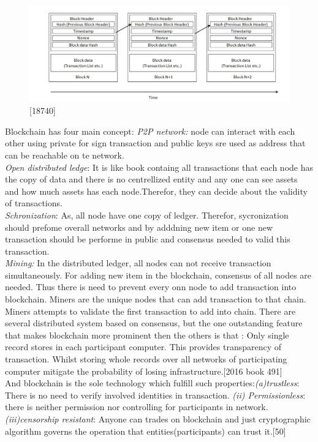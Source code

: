  \begin{center}
 	\begin{figure}[htb!]
 		
 		\begin{minipage}{0.55\linewidth}
 			\centering
 			\includegraphics[width=1.95\textwidth]{images/chap01_BlockChain.png}
 		\end{minipage}
 		\caption[Generic chain og blocks]{[18740]}
 		
 		
 	\end{figure}
 	
 \end{center}
Blockchain has four main concept: \textit{P2P network:} node can interact with each other using private for sign transaction and public keys sre used as address that can be reachable on te network. \\
   \textit{Open distributed ledge}: It is like book containg all transactions that each node has the copy of data and there is no centrellized entity and any one can see assets and how much assets has each node.Therefor, they can decide about the validity of transactions.\\
   \textit{Schronization}: As, all node have one copy of ledger. Therefor, sycronization should prefome overall networks and by adddning new item or one new transaction should be performe in public and consensus needed to valid this transaction.\\
   \textit{Mining: }In the distributed ledger, all nodes can not receive transaction simultaneously. For adding new item in the blockchain, consensus of all nodes are needed. Thus there is need to prevent every onn node to add transaction into blockchain. Miners are the unique nodes that can add transaction to that chain. Miners attempts to validate the first transaction to add into chain.  
There are several distributed system based on consensus, but the one outstanding feature that makes blockchain  more prominent then the others is that :
 Only single record stores in each participant computer. This provides transparency of transaction. Whilst storing whole 
records over all networks of participating computer mitigate the probability of losing infrastructure.[2016 book 491]\\
And blockchain is the sole technology which fulfill such properties:\textit{(a)trustless}: There is no need to verify involved identities in transaction. \textit{(ii) Permissionless}: there is neither permission nor controlling for participants in network.   \textit{(iii)censorship resistant}: Anyone can trades on blockchain and just cryptographic algorithm governs the operation that entities(participants) can trust it.[50]


